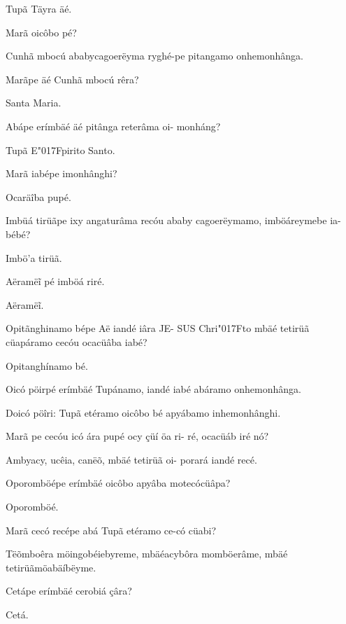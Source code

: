 \documentclass[openany,titlepage,12pt]{book}
\newcommand{\lgS}{\char"017F}
\begin{document}
\begin{altereven}
    \item Tupã Täyra äé.
    \item Marã oicôbo pé?
    \item Cunhã mbocú ababycagoerëyma ryghé-pe 
    pitangamo onhemonhânga.
    \item Marãpe äé Cunhã mbocú rêra?
    \item Santa Maria.
    \item Abápe erímbäé äé pitânga reterâma oi-
    monháng?
    \item Tupã E\lgS pirito Santo.
    \item Marã iabépe imonhânghi?
    \item Ocaräîba pupé.
    \item Imbüá tirüãpe ixy angaturâma recóu 
    \newline ababy cagoerëymamo, imböáreymebe ia-bébé?
    \item Imbö'a tirüã.
    \item Aëramëĩ pé imböá riré.
    \newpage
    \item Aëramëĩ.
    \item Opitãnghinamo bépe Aë iandé iâra JE-
    SUS Chri\lgS to mbäé tetirüã cüapáramo \linebreak
    cecóu ocacüâba iabé?
    \item Opitanghínamo bé.
    \item Oicó pöirpé erímbäé Tupánamo, iandé
    iabé abáramo onhemonhânga.
    \item Doicó pöîri: Tupã etéramo oicôbo bé
    apyábamo inhemonhânghi.
    \item Marã pe cecóu icó ára pupé ocy çüí öa ri-\linebreak
    ré, ocacüáb iré nó?
    \item Ambyacy, ucêia, canëõ, mbäé tetirüã oi-
    porará iandé recé.
    \item Oporomböépe erímbäé oicôbo apyâba motecócüâpa?
    \item Oporomböé.
    \item Marã cecó recépe abá Tupã etéramo ce-có cüabi?
    \item Tëõmboêra möingobéiebyreme, mbäé\linebreak acybôra
    momböerâme, mbäé tetirüã\linebreak möabäíbëyme.
    \item Cetápe erímbäé cerobiá çâra?
    \item Cetá.
    
\end{altereven}
\end{document}
